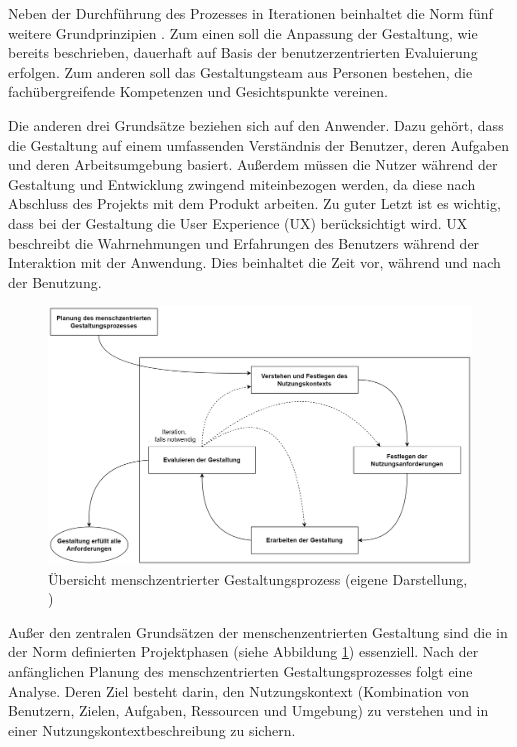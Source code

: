 \documentclass[utf8,biblatex]{lni}
\begin{document}
Neben der Durchführung des Prozesses in Iterationen beinhaltet die Norm fünf weitere Grundprinzipien \cite{DINDeutschesInstitutfurNormunge.V..}. Zum einen soll die Anpassung der Gestaltung, wie bereits beschrieben, dauerhaft auf Basis der benutzerzentrierten Evaluierung erfolgen. Zum anderen soll das Gestaltungsteam aus Personen bestehen, die fachübergreifende Kompetenzen und Gesichtspunkte vereinen. 

Die anderen drei Grundsätze beziehen sich auf den Anwender. Dazu gehört, dass die Gestaltung auf einem umfassenden Verständnis der Benutzer, deren Aufgaben und deren Arbeitsumgebung basiert. Außerdem müssen die Nutzer während der Gestaltung und Entwicklung zwingend miteinbezogen werden, da diese nach Abschluss des Projekts mit dem Produkt arbeiten. Zu guter Letzt ist es wichtig, dass bei der Gestaltung die User Experience (UX) berücksichtigt wird. UX beschreibt die Wahrnehmungen und Erfahrungen des Benutzers während der Interaktion mit der Anwendung. Dies beinhaltet die Zeit vor, während und nach der Benutzung.

\begin{figure}[h]
	\centering
	\includegraphics[width=12cm]{images/iso-9241.png}
	\caption{Übersicht menschzentrierter Gestaltungsprozess (eigene Darstellung, \cite[vgl.][]{Jendryschik.2020})}
	\label{fig:iso-9241}
\end{figure}

Außer den zentralen Grundsätzen der menschenzentrierten Gestaltung sind die in der Norm definierten Projektphasen (siehe Abbildung \ref{fig:iso-9241}) essenziell. Nach der anfänglichen Planung des menschzentrierten Gestaltungsprozesses folgt eine Analyse. Deren Ziel besteht darin, den Nutzungskontext (\glqq Kombination von Benutzern, Zielen, Aufgaben, Ressourcen und Umgebung\grqq{}) zu verstehen und in einer Nutzungskontextbeschreibung zu sichern. 
\end{document}
